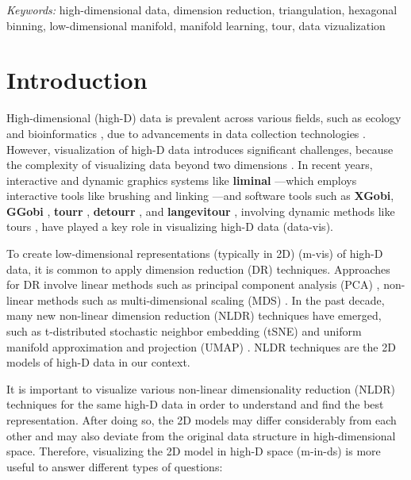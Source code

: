 \documentclass[
  12pt]{article}
\begin{document}
\noindent%
{\it Keywords:} high-dimensional data, dimension
reduction, triangulation, hexagonal binning, low-dimensional
manifold, manifold learning, tour, data vizualization
\vfill

\newpage
{} %

\section{Introduction}\label{sec-intro}

High-dimensional (high-D) data is prevalent across various fields, such
as ecology and bioinformatics \citep{Guo2023}, due to advancements in
data collection technologies \citep{Johnstone2009, ayesha2020overview}.
However, visualization of high-D data introduces significant challenges,
because the complexity of visualizing data beyond two dimensions
\citep{Jia2022}. In recent years, interactive and dynamic graphics
systems like \textbf{liminal} \citep{article21} ---which employs
interactive tools like brushing and linking \citep{article58}---and
software tools such as \textbf{XGobi}, \textbf{GGobi} \citep{article60},
\textbf{tourr} \citep{article61}, \textbf{detourr} \citep{article22},
and \textbf{langevitour} \citep{article09}, involving dynamic methods
like tours \citep{Asimov1985}, have played a key role in visualizing
high-D data (data-vis).

To create low-dimensional representations (typically in 2D) (m-vis)
\citep{article59} of high-D data, it is common to apply dimension
reduction (DR) techniques. Approaches for DR involve linear methods such
as principal component analysis (PCA) \citep{Karl1901}, non-linear
methods such as multi-dimensional scaling (MDS) \citep{Torgerson1967}.
In the past decade, many new non-linear dimension reduction (NLDR)
techniques have emerged, such as t-distributed stochastic neighbor
embedding (tSNE) \citep{Laurens2008} and uniform manifold approximation
and projection (UMAP) \citep{Leland2018}. NLDR techniques are the 2D
models of high-D data in our context.

It is important to visualize various non-linear dimensionality reduction
(NLDR) techniques for the same high-D data in order to understand and
find the best representation. After doing so, the 2D models may differ
considerably from each other and may also deviate from the original data
structure in high-dimensional space. Therefore, visualizing the 2D model
in high-D space (m-in-ds) is more useful to answer different types of
questions:
\end{document}
